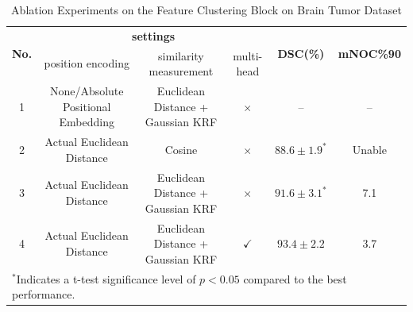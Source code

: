 \documentclass[journal,twoside,web]{ieeecolor}
\begin{document}
\begin{table}[!t]
\caption{Ablation Experiments on the Feature Clustering Block on Brain Tumor Dataset}
\label{table3}
\centering
\setlength{\tabcolsep}{12pt}
\renewcommand{\arraystretch}{1.35}
\begin{tabular}{c c c c c c}
\hline
\multirow{2}{*}{\textbf{No.}} &
\multicolumn{3}{c}{\textbf{settings}} &
\multirow{2}{*}{\textbf{DSC(\%)}} &
\multirow{2}{*}{\textbf{mNOC\%90}} \\
\cline{2-4}
 & position encoding & similarity measurement & multi-head & & \\
\hline
1 & None/Absolute Positional Embedding & Euclidean Distance + Gaussian KRF      & $\times$     & --                 & -- \\
2 & Actual Euclidean Distance          & Cosine                                 & $\times$     & $88.6\pm1.9^{*}$   & Unable \\
3 & Actual Euclidean Distance          & Euclidean Distance + Gaussian KRF      & $\times$     & $91.6\pm3.1^{*}$   & 7.1 \\
4 & Actual Euclidean Distance          & Euclidean Distance + Gaussian KRF      & $\checkmark$ & $93.4\pm2.2$       & 3.7 \\
\hline
\multicolumn{6}{l}{\footnotesize ${}^{*}$Indicates a t-test significance level of $p{<}0.05$ compared to the best performance.}
\end{tabular}
\end{table}
\end{document}
